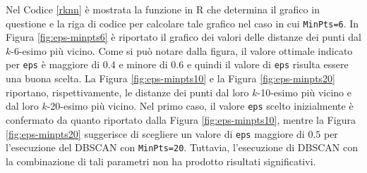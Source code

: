 \documentclass[12pt]{article}
\begin{document}
Nel Codice \ref{rknn} è mostrata la funzione in R che determina il grafico in questione e la riga di codice per calcolare tale grafico nel caso in cui \texttt{MinPts=6}. 
In Figura \ref{fig:eps-minpts6} è riportato il grafico dei valori delle distanze dei punti dal $k$-6-esimo più vicino. 
Come si può notare dalla figura, il valore ottimale indicato per \texttt{eps} è maggiore di $0.4$ e minore di $0.6$ e quindi il valore di \texttt{eps} risulta essere una buona scelta. 
La Figura \ref{fig:eps-minpts10} e la Figura \ref{fig:eps-minpts20} riportano, rispettivamente, le distanze dei punti dal loro $k$-10-esimo più vicino e dal loro $k$-20-esimo più vicino. 
Nel primo caso, il valore \texttt{eps} scelto inizialmen\-te è confermato da quanto riportato dalla Figura \ref{fig:eps-minpts10}, mentre la Figura \ref{fig:eps-minpts20} suggerisce di scegliere un valore di \texttt{eps} maggiore di $0.5$ per l'esecuzione del DBSCAN con \texttt{MinPts=20}. 
Tuttavia, l'esecuzione di DBSCAN con la combinazione di tali parametri non ha prodotto risultati significativi.
\end{document}
